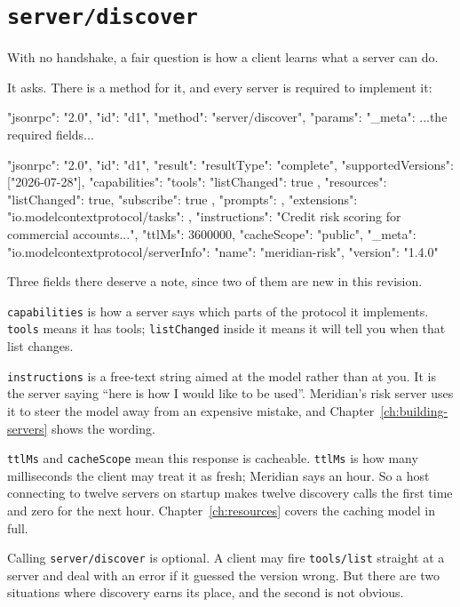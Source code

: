 \section{\texttt{server/discover}}

With no handshake, a fair question is how a client learns what a server can do.

It asks. There is a method for it, and every server is required to implement it:

\begin{wire}
{ "jsonrpc": "2.0", "id": "d1", "method": "server/discover",
  "params": { "_meta": { ...the required fields... } } }
\end{wire}

\begin{wire}
{
  "jsonrpc": "2.0",
  "id": "d1",
  "result": {
    "resultType": "complete",
    "supportedVersions": ["2026-07-28"],
    "capabilities": {
      "tools": { "listChanged": true },
      "resources": { "listChanged": true, "subscribe": true },
      "prompts": {},
      "extensions": { "io.modelcontextprotocol/tasks": {} }
    },
    "instructions": "Credit risk scoring for commercial accounts...",
    "ttlMs": 3600000,
    "cacheScope": "public",
    "_meta": {
      "io.modelcontextprotocol/serverInfo": {
        "name": "meridian-risk", "version": "1.4.0"
      }
    }
  }
}
\end{wire}

Three fields there deserve a note, since two of them are new in this revision.

\texttt{capabilities} is how a server says which parts of the protocol it
implements. \texttt{tools} means it has tools; \texttt{listChanged} inside it
means it will tell you when that list changes.

\texttt{instructions} is a free-text string aimed at the model rather than at
you. It is the server saying ``here is how I would like to be used''. Meridian's
risk server uses it to steer the model away from an expensive mistake, and
Chapter~\ref{ch:building-servers} shows the wording.

\texttt{ttlMs} and \texttt{cacheScope} mean this response is cacheable.
\texttt{ttlMs} is how many milliseconds the client may treat it as fresh;
Meridian says an hour. So a host connecting to twelve servers on startup makes
twelve discovery calls the first time and zero for the next hour.
Chapter~\ref{ch:resources} covers the caching model in full.

Calling \texttt{server/discover} is optional. A client may fire \texttt{tools/list}
straight at a server and deal with an error if it guessed the version wrong. But
there are two situations where discovery earns its place, and the second is not
obvious.

